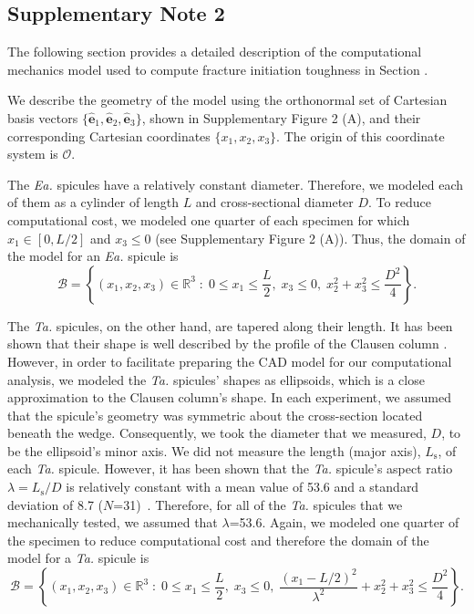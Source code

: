 \documentclass[12pt,onecolumn]{article}
\makeatletter
\DeclareRobustCommand*{\nameref}[1]{%
      \emph{\myorg@nameref{#1}}%
    }%
\newcommand{\ex}{\hat{\mathbf{e}}_1}
\newcommand{\ey}{\hat{\mathbf{e}}_2}
\newcommand{\ez}{\hat{\mathbf{e}}_3}
\newcommand{\TA}{\textit{Ta.\@}\xspace}
\newcommand{\EA}{\textit{Ea.\@}\xspace}
\makeatother
\begin{document}
\begin{bibunit}
\section*{Supplementary Note 2}
\label{sec:Vextmethod}

The following section provides a detailed description of the computational mechanics model used to compute fracture initiation toughness in Section \nameref{sec:Gc}.

We describe the geometry of the model using the orthonormal set of Cartesian basis vectors $\{\ex,\ey,\ez\}$, shown in Supplementary Figure 2 (A), and their corresponding Cartesian coordinates $\{x_1,x_2,x_3\}$. The origin of this coordinate system is $\mathcal{O}$.

The \EA spicules have a relatively constant diameter. Therefore, we modeled each of them as a cylinder of length $L$ and cross-sectional diameter $D$. To reduce computational cost, we modeled one quarter of each specimen for which $x_1 \in [0,L/2]$ and $x_3\leq 0$ (see Supplementary Figure 2 (A)). Thus, the domain of the model for an \EA spicule is 
%
\[\mathcal{B} = \left\{(x_1,x_2,x_3) \in \mathbb{R}^3 \; : \; 0 \leq x_1 \leq \frac{L}{2}, \; x_3 \leq 0, \; x_2^2+x_3^2\leq \frac{D^2}{4}\right\}.\]

The \TA spicules, on the other hand, are tapered along their length. It has been shown that their shape is well described by the profile of the Clausen column \cite{monn2017new}. However, in order to facilitate preparing the CAD model for our computational analysis, we modeled the \TA spicules' shapes as ellipsoids, which is a close approximation to the Clausen column's shape. In each experiment, we assumed that the spicule's geometry was symmetric about the cross-section located beneath the wedge. Consequently, we took the diameter that we measured, $D$, to be the ellipsoid's minor axis.  We did not measure the length (major axis), $L_\mathrm{s}$, of each \TA spicule. However, it has been shown that the \TA spicule's aspect ratio $\lambda=L_\mathrm{s}/D$ is relatively constant with a mean value of 53.6 and a standard deviation of 8.7 ($N$=31)~\cite{monn2017new}. Therefore, for all of the \TA spicules that we mechanically tested, we assumed that $\lambda$=53.6. Again, we modeled one quarter of the specimen to reduce computational cost and therefore the domain of the model for a \TA spicule is 
%
\[\mathcal{B} = \left\{(x_1,x_2,x_3) \in \mathbb{R}^3 \; : \; 0 \leq x_1 \leq \frac{L}{2}, \; x_3 \leq 0, \; \frac{(x_1-L/2)^2}{\lambda^2}+x_2^2+x_3^2\leq \frac{D^2}{4}\right\}.\]



\end{bibunit}
\end{document}
